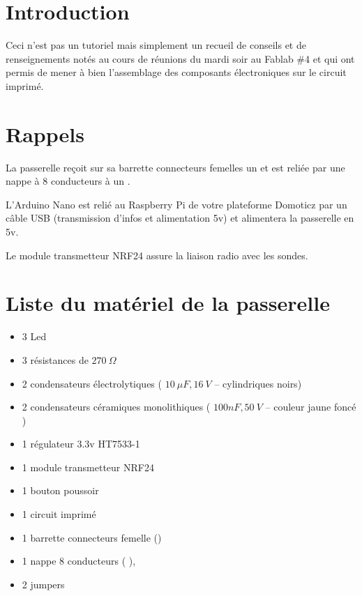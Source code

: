 
\section{Introduction}

Ceci n'est pas un tutoriel mais simplement un recueil de conseils et de renseignements notés au cours de réunions du mardi soir au Fablab \#4 et qui ont permis de mener à bien l'assemblage des composants électroniques sur le circuit imprimé.

\section{Rappels}

La passerelle reçoit sur sa barrette connecteurs femelles un  et est reliée par une nappe à 8 conducteurs à un .

L'Arduino Nano est relié au Raspberry Pi de votre plateforme Domoticz par un câble USB (transmission d'infos et alimentation 5v) et alimentera la passerelle en 5v.

Le module transmetteur NRF24 assure la liaison radio avec les sondes. 

\section{Liste du matériel de la passerelle}

\begin{itemize}
    \item 3 Led
    \item 3 résistances de $270~\Omega$
    \item 2 condensateurs électrolytiques ( $10~\mu F, 16~V$ – cylindriques noirs)
    \item 2 condensateurs céramiques monolithiques ( $100nF, 50~V$ – couleur jaune foncé )
    \item 1 régulateur 3.3v HT7533-1
    \item 1 module transmetteur NRF24
    \item 1 bouton poussoir
    \item 1 circuit imprimé
    \item 1 barrette connecteurs femelle ({\color{red}{déjà montée sur le circuit imprimé}})
    \item 1 nappe 8 conducteurs ({\color{red}{dont l'un porte un liseré rouge}} ),
    \item 2 jumpers
\end{itemize}

